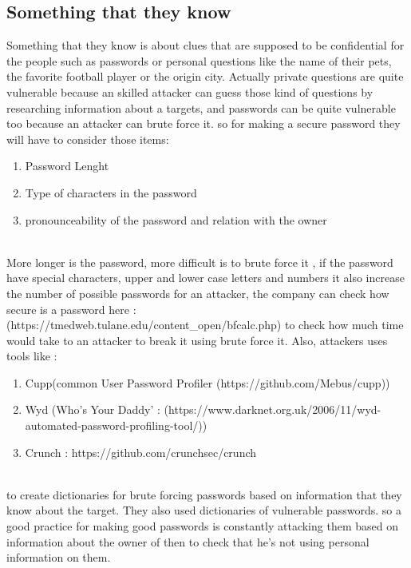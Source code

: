 \documentclass[10pt,a4paper]{article} %
\begin{document}
        \subsection{Something that they know}
            Something that they know is about clues that are supposed to be
            confidential for the people
            such as passwords or personal questions like the name of their pets,
            the favorite football player or the origin city.
            Actually private questions are quite vulnerable because an skilled
            attacker can guess those kind of questions by researching information
            about a targets, and passwords can be quite vulnerable too because an
            attacker can brute force it. so for making a secure password they will
            have to consider those items: 
            \\ 
        \begin{enumerate}
            \item {Password Lenght} 
            \item {Type of characters in the password} 
            \item {pronounceability of the password and relation with the owner} 
        \end{enumerate}
            \\ 
            More longer is the password, more difficult is to brute force it , if
            the password have special characters, upper and lower case letters and
            numbers it also increase the number of possible passwords for an
            attacker, the company can check how secure is a password here :
            (https://tmedweb.tulane.edu/content\_open/bfcalc.php) to check how much
            time would take to an attacker to break it using brute force it. Also, attackers uses tools like :
            \\ 
        \begin{enumerate}
            \item {Cupp(common User Password Profiler (https://github.com/Mebus/cupp))} 
            \item {Wyd (Who's Your Daddy' : (https://www.darknet.org.uk/2006/11/wyd-automated-password-profiling-tool/))} 
            \item {Crunch : https://github.com/crunchsec/crunch} 
        \end{enumerate}
        
            \\ 
            to create dictionaries for brute forcing passwords based on information that they know about the
            target. They also used dictionaries of vulnerable passwords. so a
            good practice for making good passwords is constantly
            attacking them based on information about the owner of then to
            check
            that he's not using personal information on them.
\end{document}
